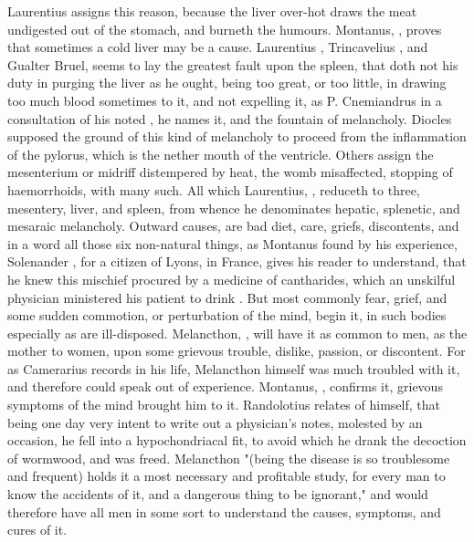 Laurentius assigns this reason, because the liver over-hot draws the meat
undigested out of the stomach, and burneth the humours. Montanus,
, proves that sometimes a cold liver may be a
cause. Laurentius , Trincavelius
, and Gualter Bruel, seems to lay the
greatest fault upon the spleen, that doth not his duty in purging the liver as
he ought, being too great, or too little, in drawing too much blood sometimes
to it, and not expelling it, as P. Cnemiandrus in a
consultation of his noted , he names
it, and the fountain of melancholy. Diocles supposed the ground of this kind of
melancholy to proceed from the inflammation of the pylorus, which is the nether
mouth of the ventricle. Others assign the mesenterium or midriff distempered by
heat, the womb misaffected, stopping of haemorrhoids, with many such. All which
Laurentius, , reduceth to three, mesentery,
liver, and spleen, from whence he denominates hepatic, splenetic, and mesaraic
melancholy. Outward causes, are bad diet, care, griefs, discontents, and in a
word all those six non-natural things, as Montanus found by his experience,
 Solenander , for a citizen of Lyons, in France, gives his reader to understand, that he
knew this mischief procured by a medicine of cantharides, which an unskilful
physician ministered his patient to drink . But most
commonly fear, grief, and some sudden commotion, or perturbation of the mind,
begin it, in such bodies especially as are ill-disposed. Melancthon,
, will have it as common to
men, as the mother to women, upon some grievous trouble, dislike, passion, or
discontent. For as Camerarius records in his life, Melancthon himself was much
troubled with it, and therefore could speak out of experience. Montanus,
, confirms it,
grievous symptoms of the mind brought him to it.
Randolotius relates of himself, that being one day very intent to write out a
physician's notes, molested by an occasion, he fell into a hypochondriacal fit,
to avoid which he drank the decoction of wormwood, and was freed.
Melancthon "(being the disease is so troublesome and
frequent) holds it a most necessary and profitable study, for every man to know
the accidents of it, and a dangerous thing to be ignorant," and would therefore
have all men in some sort to understand the causes, symptoms, and cures of it.


